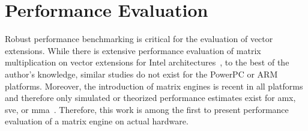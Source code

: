 \documentclass[\main/thesis.tex]{subfiles}
\begin{document}
\section{Performance Evaluation}
Robust performance benchmarking is critical for the evaluation of vector extensions.
While there is extensive performance evaluation of matrix multiplication on vector extensions for Intel architectures~\autocite{hassan20161performance,hemeida2020optimizing,alappat2020understanding}, to the best of the author's knowledge, similar studies do not exist for the PowerPC or ARM platforms.
Moreover, the introduction of matrix engines is recent in all platforms and therefore only simulated or theorized performance estimates exist for \gls{amx}, \gls{sve}, or \gls{mma}~\autocite{poenaru2020evaluating,domke2021matrix}.
Therefore, this work is among the first to present performance evaluation of a matrix engine on actual hardware.
\end{document}

